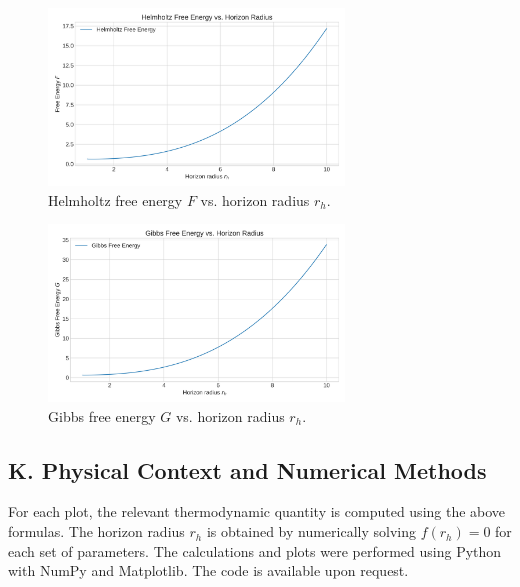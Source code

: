 \documentclass[12pt]{article}
\begin{document}
\begin{figure}[h!]
    \centering
    \includegraphics[width=0.7\textwidth]{figures/free_energy_vs_rh.png}
    \caption{Helmholtz free energy $F$ vs. horizon radius $r_h$.}
\end{figure}

\begin{figure}[h!]
    \centering
    \includegraphics[width=0.7\textwidth]{figures/gibbs_energy_vs_rh.png}
    \caption{Gibbs free energy $G$ vs. horizon radius $r_h$.}
\end{figure}

\subsection*{K. Physical Context and Numerical Methods}
For each plot, the relevant thermodynamic quantity is computed using the above formulas. The horizon radius $r_h$ is obtained by numerically solving $f(r_h) = 0$ for each set of parameters. The calculations and plots were performed using Python with NumPy and Matplotlib. The code is available upon request.
\end{document}
